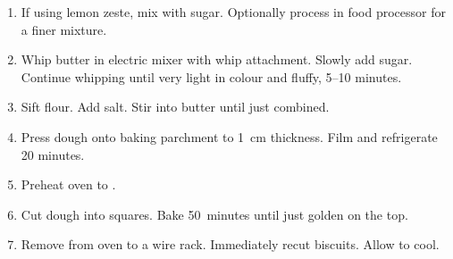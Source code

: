 
\begin{ingredients}
\end{ingredients}


\begin{recipe}
  \begin{enumerate}

  \item If using lemon zeste, mix with sugar.  Optionally process in
    food processor for a finer mixture.

  \item Whip butter in electric mixer with whip attachment.  Slowly
    add sugar.  Continue whipping until very light in colour and
    fluffy, 5--10 minutes.

  \item Sift flour.  Add salt.  Stir into butter until just combined.

  \item Press dough onto baking parchment to 1~cm thickness.  Film and
    refrigerate 20 minutes.

  \item Preheat oven to .

  \item Cut dough into squares.  Bake 50~minutes until just golden on
    the top.

  \item Remove from oven to a wire rack.  Immediately recut biscuits.
    Allow to cool.

  \end{enumerate}
\end{recipe}


